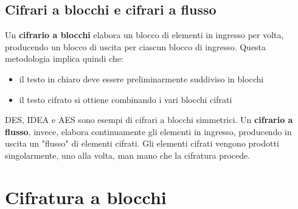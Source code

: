 \subsection{Cifrari a blocchi e cifrari a flusso}
Un \textbf{cifrario a blocchi} elabora un blocco di elementi in ingresso per volta, producendo un blocco di uscita per ciascun blocco di ingresso. Questa metodologia implica quindi che:
\begin{itemize}
  \item il testo in chiaro deve essere preliminarmente suddiviso in blocchi
  \item il testo cifrato si ottiene combinando i vari blocchi cifrati
\end{itemize}
DES, IDEA e AES sono esempi di cifrari a blocchi simmetrici. Un \textbf{cifrario a flusso}, invece, elabora continuamente gli elementi in ingresso, producendo in uscita un "flusso" di elementi cifrati. Gli elementi cifrati vengono prodotti singolarmente, uno alla volta, man mano che la cifratura procede.

\section{Cifratura a blocchi}


